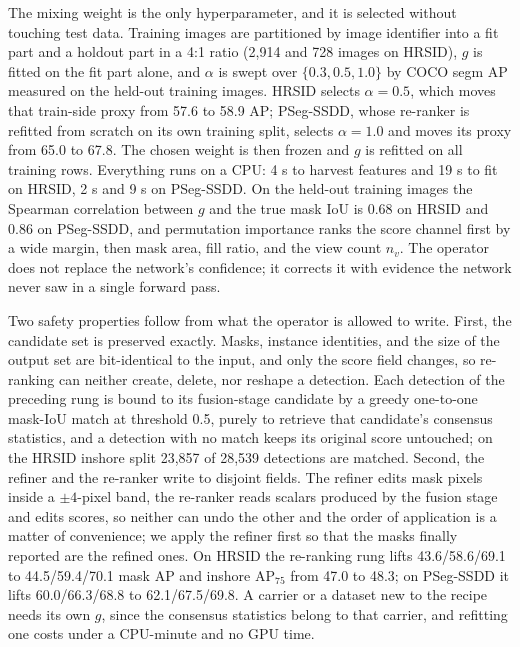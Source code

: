 The mixing weight is the only hyperparameter, and it is selected without touching test data. Training images are partitioned by image identifier into a fit part and a holdout part in a 4:1 ratio (2{,}914 and 728 images on HRSID), $g$ is fitted on the fit part alone, and $\alpha$ is swept over $\{0.3,0.5,1.0\}$ by COCO segm AP measured on the held-out training images. HRSID selects $\alpha=0.5$, which moves that train-side proxy from 57.6 to 58.9 AP; PSeg-SSDD, whose re-ranker is refitted from scratch on its own training split, selects $\alpha=1.0$ and moves its proxy from 65.0 to 67.8. The chosen weight is then frozen and $g$ is refitted on all training rows. Everything runs on a CPU: 4 s to harvest features and 19 s to fit on HRSID, 2 s and 9 s on PSeg-SSDD. On the held-out training images the Spearman correlation between $g$ and the true mask IoU is 0.68 on HRSID and 0.86 on PSeg-SSDD, and permutation importance ranks the score channel first by a wide margin, then mask area, fill ratio, and the view count $n_v$. The operator does not replace the network's confidence; it corrects it with evidence the network never saw in a single forward pass.

Two safety properties follow from what the operator is allowed to write. First, the candidate set is preserved exactly. Masks, instance identities, and the size of the output set are bit-identical to the input, and only the score field changes, so re-ranking can neither create, delete, nor reshape a detection. Each detection of the preceding rung is bound to its fusion-stage candidate by a greedy one-to-one mask-IoU match at threshold 0.5, purely to retrieve that candidate's consensus statistics, and a detection with no match keeps its original score untouched; on the HRSID inshore split 23{,}857 of 28{,}539 detections are matched. Second, the refiner and the re-ranker write to disjoint fields. The refiner edits mask pixels inside a $\pm 4$-pixel band, the re-ranker reads scalars produced by the fusion stage and edits scores, so neither can undo the other and the order of application is a matter of convenience; we apply the refiner first so that the masks finally reported are the refined ones. On HRSID the re-ranking rung lifts 43.6/58.6/69.1 to 44.5/59.4/70.1 mask AP and inshore AP$_{75}$ from 47.0 to 48.3; on PSeg-SSDD it lifts 60.0/66.3/68.8 to 62.1/67.5/69.8. A carrier or a dataset new to the recipe needs its own $g$, since the consensus statistics belong to that carrier, and refitting one costs under a CPU-minute and no GPU time.

